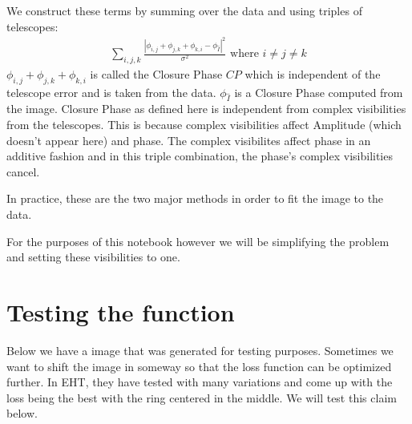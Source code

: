 \documentclass[letterpaper,10pt,english]{jupyterBook}
\begin{document}
\sphinxAtStartPar
We construct these terms by summing over the data and using triples of telescopes:
\begin{equation*}
\begin{split} \sum_{i,j,k} \frac{|\phi_{i,j} + \phi_{j,k} + \phi_{k,i} - \phi_{\hat{I}}|^2}{\sigma^2} \text{ where }i \neq j \neq k\end{split}
\end{equation*}
\sphinxAtStartPar
\(\phi_{i,j} + \phi_{j,k} + \phi_{k,i}\) is called the Closure Phase \(CP\) which is independent of the telescope error and is taken from the data. \(\phi_{\hat{I}}\) is a Closure Phase computed from the image. Closure Phase as defined here is independent from complex visibilities from the telescopes. This is because complex visibilities affect Amplitude (which doesn’t appear here) and phase. The complex visibilites affect phase in an additive fashion and in this triple combination, the phase’s complex visibilities cancel.

\sphinxAtStartPar
In practice, these are the two major methods in order to fit the image to the data.

\sphinxAtStartPar
For the purposes of this notebook however we will be simplifying the problem and setting these visibilities to one.


\section{Testing the function}
\label{\detokenize{loss:testing-the-function}}
\sphinxAtStartPar
Below we have a image that was generated for testing purposes. Sometimes we want to shift the image in someway so that the loss function can be optimized further. In EHT, they have tested with many variations and come up with the loss being the best with the ring centered in the middle. We will test this claim below.
\end{document}
